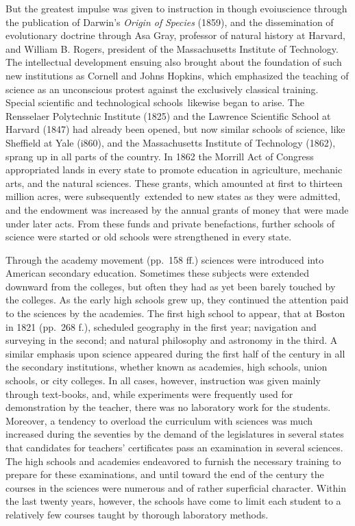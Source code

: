 \documentclass[]{book}
\begin{document}
But the greatest impulse was given to instruction in though evoiuscience through the publication of Darwin's \emph{Origin of} \emph{Species} (1859), and the dissemination of evolutionary doctrine through Asa Gray, professor of natural history at Harvard, and William B. Rogers, president of the Massachusetts Institute of Technology. The intellectual development ensuing also brought about the foundation of such new institutions as Cornell and Johns Hopkins, which emphasized the teaching of science as an unconscious protest against the exclusively classical training. Special scientific and technological schools~likewise began to arise. The Rensselaer Polytechnic Institute (1825) and the Lawrence Scientific School at Harvard (1847) had already been opened, but now similar schools of science, like Sheffield at Yale (i860), and the Massachusetts Institute of Technology (1862), sprang up in all parts of the country. In 1862 the Morrill Act of Congress appropriated lands in every state to promote education in agriculture, mechanic arts, and the natural sciences. These grants, which amounted at first to thirteen million acres, were subsequently~extended to new states as they were admitted, and the endowment was increased by the annual grants of money that were made under later acts. From these funds and private benefactions, further schools of science were started or old schools were strengthened in every state.

Through the academy movement (pp.~158 ff.) sciences were introduced into American secondary education. Sometimes these subjects were extended downward from the colleges, but often they had as yet been barely touched by the colleges. As the early high schools grew up, they continued the attention paid to the sciences by the academies. The first high school to appear, that at Boston in 1821 (pp.~268 f.), scheduled geography in the first year; navigation and surveying in the second; and natural philosophy and astronomy in the third. A similar emphasis upon science appeared during the first half of the century in all the secondary institutions, whether known as academies, high schools, union schools, or city colleges. In all cases, however, instruction was given mainly through text-books, and, while experiments were frequently used for demonstration by the teacher, there was no laboratory work for the students. Moreover, a tendency to overload the curriculum with sciences was much increased during the seventies by the demand of the legislatures in several states that candidates for teachers' certificates pass an examination in several sciences. The high schools and academies endeavored to furnish the necessary training to prepare for these examinations, and until toward the end of the century the courses in the sciences were numerous and of rather superficial character. Within the last twenty years, however, the schools have come to limit each student to a relatively few courses taught by thorough laboratory methods.
\end{document}
